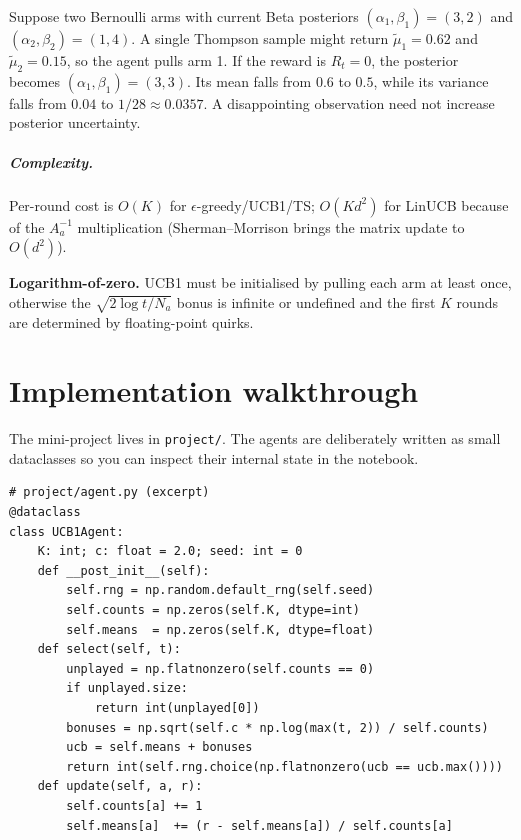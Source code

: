 \documentclass[11pt,oneside]{scrbook}
\begin{document}
\begin{example}
Suppose two Bernoulli arms with current Beta posteriors
$(\alpha_1,\beta_1) = (3,2)$ and $(\alpha_2,\beta_2)=(1,4)$. A single Thompson
sample might return $\tilde\mu_1=0.62$ and $\tilde\mu_2=0.15$, so the agent pulls
arm 1. If the reward is $R_t=0$, the posterior becomes
$(\alpha_1,\beta_1)=(3,3)$. Its mean falls from $0.6$ to $0.5$, while
its variance falls from $0.04$ to $1/28\approx0.0357$. A disappointing
observation need not increase posterior uncertainty.
\end{example}

\paragraph{Complexity.} Per-round cost is $O(K)$ for $\epsilon$-greedy/UCB1/TS;
$O(K d^2)$ for LinUCB because of the $A_a^{-1}$ multiplication (Sherman--Morrison
brings the matrix update to $O(d^2)$).

\begin{pitfall}
\textbf{Logarithm-of-zero.} UCB1 must be initialised by pulling each arm at
least once, otherwise the $\sqrt{2\log t/N_a}$ bonus is infinite or undefined
and the first $K$ rounds are determined by floating-point quirks.
\end{pitfall}

\chapter{Implementation walkthrough}

The mini-project lives in \texttt{project/}. The agents are
deliberately written as small dataclasses so you can inspect their internal
state in the notebook.

\begin{codebox}
\begin{verbatim}
# project/agent.py (excerpt)
@dataclass
class UCB1Agent:
    K: int; c: float = 2.0; seed: int = 0
    def __post_init__(self):
        self.rng = np.random.default_rng(self.seed)
        self.counts = np.zeros(self.K, dtype=int)
        self.means  = np.zeros(self.K, dtype=float)
    def select(self, t):
        unplayed = np.flatnonzero(self.counts == 0)
        if unplayed.size:
            return int(unplayed[0])
        bonuses = np.sqrt(self.c * np.log(max(t, 2)) / self.counts)
        ucb = self.means + bonuses
        return int(self.rng.choice(np.flatnonzero(ucb == ucb.max())))
    def update(self, a, r):
        self.counts[a] += 1
        self.means[a]  += (r - self.means[a]) / self.counts[a]
\end{verbatim}
\end{codebox}
\end{document}
